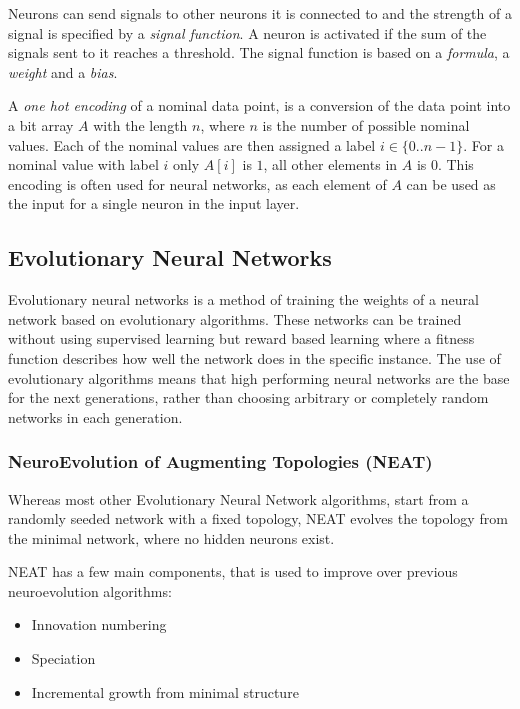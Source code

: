 \newpar Neurons can send signals to other neurons it is connected to and the strength of a signal is specified by a \textit{signal function}. A neuron is activated if the sum of the signals sent to it reaches a threshold. The signal function is based on a \textit{formula}, a \textit{weight} and a \textit{bias}. 

\newpar A \textit{one hot encoding} of a nominal data point, is a conversion of the data point into a bit array $A$ with the length $n$, where $n$ is the number of possible nominal values. Each of the nominal values are then assigned a label $i \in \{0 .. n-1\}$. For a nominal value with label $i$ only $ A[i] $ is $1$, all other elements in $A$ is $0$. This encoding is often used for neural networks, as each element of $A$ can be used as the input for a single neuron in the input layer.

\subsection{Evolutionary Neural Networks}
Evolutionary neural networks is a method of training the weights of a neural network based on evolutionary algorithms. These networks can be trained without using supervised learning but reward based learning where a fitness function describes how well the network does in the specific instance. The use of evolutionary algorithms means that high performing neural networks are the base for the next generations, rather than choosing arbitrary or completely random networks in each generation.

\subsubsection{NeuroEvolution of Augmenting Topologies (NEAT)}
Whereas most other Evolutionary Neural Network algorithms, start from a randomly seeded network with a fixed topology, NEAT evolves the topology from the minimal network, where no hidden neurons exist.

\newpar NEAT has a few main components, that is used to improve over previous neuroevolution algorithms:

\begin{itemize}
	\item Innovation numbering
	\item Speciation
	\item Incremental growth from minimal structure
\end{itemize}

